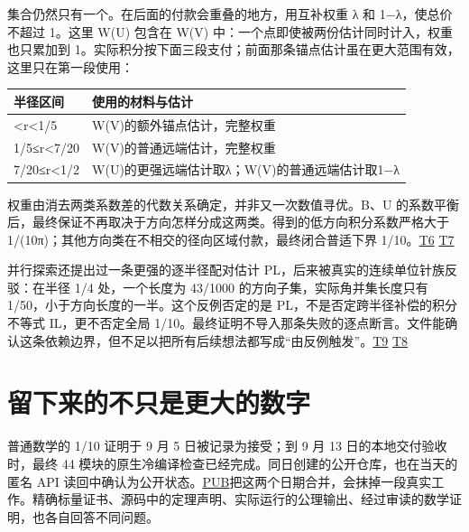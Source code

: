 集合仍然只有一个。在后面的付款会重叠的地方，用互补权重 λ 和 1−λ，使总价不超过 1。这里 W(U) 包含在 W(V) 中：一个点即使被两份估计同时计入，权重也只累加到 1。实际积分按下面三段支付；前面那条锚点估计虽在更大范围有效，这里只在第一段使用：

{\def\LTcaptype{none} %
\begin{longtable}[]{@{}ll@{}}
\toprule\noalign{}
半径区间 & 使用的材料与估计 \\
\midrule\noalign{}
\endhead
\bottomrule\noalign{}
\endlastfoot
0\textless r\textless1/5 & W(V)的额外锚点估计，完整权重 \\
1/5≤r\textless7/20 & W(V)的普通远端估计，完整权重 \\
7/20≤r\textless1/2 & W(U)的更强远端估计取λ；W(V)的普通远端估计取1−λ \\
\end{longtable}
}

权重由消去两类系数差的代数关系确定，并非又一次数值寻优。B、U 的系数平衡后，最终保证不再取决于方向怎样分成这两类。得到的低方向积分系数严格大于 1/(10π)；其他方向类在不相交的径向区域付款，最终闭合普适下界 1/10。\href{https://github.com/subfish-zhou/star-shaped-kakeya-lean/blob/6432d8eb33cc2093ed5ca1f5e63390e4bf065fd0/history/one-tenth/low-source-b2/integrated-low/PROOF.md}{T6} \href{https://github.com/subfish-zhou/star-shaped-kakeya-lean/blob/6432d8eb33cc2093ed5ca1f5e63390e4bf065fd0/history/one-tenth/THEOREM_01.md}{T7}

并行探索还提出过一条更强的逐半径配对估计 PL，后来被真实的连续单位针族反驳：在半径 1/4 处，一个长度为 43/1000 的方向子集，实际角并集长度只有 1/50，小于方向长度的一半。这个反例否定的是 PL，不是否定跨半径补偿的积分不等式 IL，更不否定全局 1/10。最终证明不导入那条失败的逐点断言。文件能确认这条依赖边界，但不足以把所有后续想法都写成``由反例触发''。\href{https://github.com/subfish-zhou/star-shaped-kakeya-lean/blob/6432d8eb33cc2093ed5ca1f5e63390e4bf065fd0/history/one-tenth/low-source-b2/paired-pointwise/COUNTEREXAMPLE.md}{T9} \href{https://github.com/subfish-zhou/star-shaped-kakeya-lean/blob/6432d8eb33cc2093ed5ca1f5e63390e4bf065fd0/history/one-tenth/tenth-reviews/b2_universal_tenth_end_to_end_review.md}{T8}

\section{留下来的不只是更大的数字}\label{ux7559ux4e0bux6765ux7684ux4e0dux53eaux662fux66f4ux5927ux7684ux6570ux5b57}

普通数学的 1/10 证明于 9 月 5 日被记录为接受；到 9 月 13 日的本地交付验收时，最终 44 模块的原生冷编译检查已经完成。同日创建的公开仓库，也在当天的匿名 API 读回中确认为公开状态。\href{https://github.com/subfish-zhou/star-shaped-kakeya-lean/blob/6432d8eb33cc2093ed5ca1f5e63390e4bf065fd0/writing-evidence/public-repository-readback.json}{PUB}把这两个日期合并，会抹掉一段真实工作。精确标量证书、源码中的定理声明、实际运行的公理输出、经过审读的数学证明，也各自回答不同问题。

